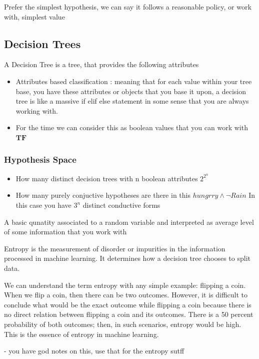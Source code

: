 \documentclass{article}
\theoremstyle{mytheoremstyle}
\theoremstyle{mytheoremstyle}
\theoremstyle{myproblemstyle}
\begin{document}
\begin{definition}
	Prefer the simplest hypothesis, we can say it follows a reasonable policy, or work with, simplest value
\end{definition}


\subsection{Decision Trees}
\begin{definition}
	A Decision Tree is a tree, that provides the following attributes
	\begin{itemize}
		\item Attributes based classification : meaning that for each value within your tree base, you have these attributes or objects that you base it upon, a decision tree is like  a massive if elif else statement in some sense that you are always working with.
		\item For the time we can consider this as boolean values that you can work with
		      \begin{math}
			      \mathbf{T}  \mathbf{F}
		      \end{math}
	\end{itemize}
\end{definition}
\subsubsection{Hypothesis Space}
\begin{itemize}
	\item How many distinct decision trees with n boolean attributes
	      \begin{math}
		      2^{2^{n}}
	      \end{math}
	\item How many purely conjuctive hypotheses are there in this
	      \begin{math}
		      hungrry \land \neg Rain
	      \end{math}
	      In this case you have \( 3^{n} \)  distinct conductive forms
\end{itemize}
\begin{definition}[Entropy]
	A basic qunatity associated to a random variable and interpreted as average level of some information that you work with

	Entropy is the measurement of disorder or impurities in the information processed in machine learning. It determines how a decision tree chooses to split data.

	We can understand the term entropy with any simple example: flipping a coin. When we flip a coin, then there can be two outcomes. However, it is difficult to conclude what would be the exact outcome while flipping a coin because there is no direct relation between flipping a coin and its outcomes. There is a 50 percent  probability of both outcomes; then, in such scenarios, entropy would be high. This is the essence of entropy in machine learning.

	- you have god notes on this, use that for the entropy sutff
\end{definition}
\end{document}
